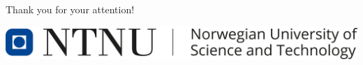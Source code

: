 \documentclass{beamer}
\begin{document}



\begin{frame}
\centering
Thank you for your attention!\\
		\vskip 0.8cm

\centering
\includegraphics[scale=0.2]{ntnulogo_eng.png}
\end{frame} 
\end{document}
